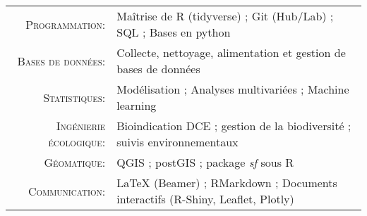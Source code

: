%
%
%

\renewcommand{\arraystretch}{1.1}

	\begin{tabular}{>{}r>{}p{13cm}} 
		\textsc{Programmation:}              &    Maîtrise de R (tidyverse) ; Git (Hub/Lab) ; SQL ; Bases en python\\ 
		\textsc{Bases de données:}               	&   Collecte, nettoyage, alimentation et gestion de bases de données \\ 
		\textsc{Statistiques:}  	 &   Modélisation ;  Analyses multivariées ; Machine learning \\
		\textsc{Ingénierie écologique:}              &    Bioindication DCE ; gestion de la biodiversité ; suivis environnementaux \\
		\textsc{Géomatique:}			&   QGIS ; postGIS ; package \textit{sf} sous R \\ 
		\textsc{Communication:}               	&   LaTeX (Beamer) ; RMarkdown ; Documents interactifs (R-Shiny, Leaflet, Plotly) 
	\end{tabular}